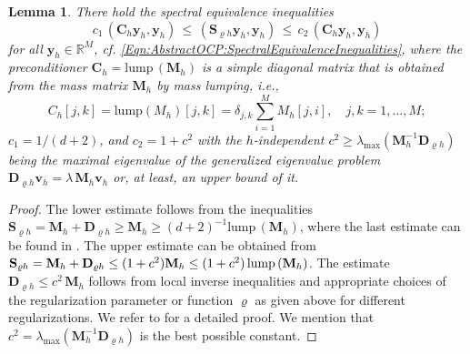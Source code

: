 \documentclass{article}
\newtheorem{lemma}{Lemma}
\numberwithin{equation}{section}
\begin{document}
\begin{lemma}\label{Lemma:Application:SpectralEquivalenceInequalitiesCSC}
  There hold the spectral equivalence inequalities
  \begin{equation}\label{Eqn:Application:SpectralEquivalenceInequalitiesCSC}
    c_1 \, ( \mathbf{C}_h \mathbf{y}_h , \mathbf{y}_h) \, \leq \,
    (\mathbf{S}_{\varrho h} \mathbf{y}_h , \mathbf{y}_h) \, \leq \,
    c_2 \, (\mathbf{C}_h \mathbf{y}_h, \mathbf{y}_h) 
\end{equation}    
for all $\mathbf{y}_h \in {\mathbb{R}}^M$, cf.
\eqref{Eqn:AbstractOCP:SpectralEquivalenceInequalities}, where the
preconditioner $\mathbf{C}_h = \mbox{lump} \, (\mathbf{M}_h)$ is a simple
diagonal matrix that is obtained from the mass matrix $\mathbf{M}_h$ by
mass lumping, i.e.,
\begin{equation*}
  C_h[j,k] = \mbox{lump}(M_h)[j,k] =
  \delta_{j,k} \sum_{i=1}^M M_h[j,i], \quad j,k = 1,\ldots,M;
\end{equation*}
$c_1 = 1/(d+2)$, and $c_2 = 1 + c^2$ with the $h$-independent
$c^2 \ge \lambda_{\max}(\mathbf{M}_h^{-1}\mathbf{D}_{\varrho h})$
being the maximal eigenvalue of the generalized eigenvalue problem
$\mathbf{D}_{\varrho h} \mathbf{v}_h = \lambda \, \mathbf{M}_h\mathbf{v}_h$ 
or, at least, an upper bound of it.
\end{lemma}

\begin{proof}
The lower estimate follows from the inequalities 
$\mathbf{S}_{\varrho h} = \mathbf{M}_h + \mathbf{D}_{\varrho h} \ge
\mathbf{M}_h \ge (d+2)^{-1} \mbox{lump} \, (\mathbf{M}_h)$, where the last
estimate can be found in \cite[Lemma~1]{LangerLoescherSteinbachYang:2024NLA}. 
The upper estimate can be obtained from 
$\mathbf{S}_{\varrho h} = \mathbf{M}_h + \mathbf{D}_{\varrho h} \le
(1 + c^2) \mathbf{M}_h \le \linebreak
(1 + c^2)\, \mbox{lump} \, (\mathbf{M}_h)$.
The estimate $\mathbf{D}_{\varrho h} \le c^2\, \mathbf{M}_h$ follows from
local inverse inequalities and appropriate choices of the regularization
parameter or function $\varrho$ as given above for different regularizations.
We refer to  \cite{LangerLoescherSteinbachYang:2024NLA} for a detailed proof. 
We mention that $c^2 = \lambda_{\max}(\mathbf{M}_h^{-1}\mathbf{D}_{\varrho h})$
is the best possible constant.
\end{proof}
\end{document}

